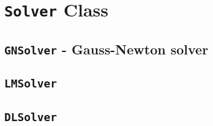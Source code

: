 \section{\texttt{Solver} Class}
\subsection{\texttt{GNSolver} - Gauss-Newton solver}
\subsection{\texttt{LMSolver}}
\subsection{\texttt{DLSolver}}